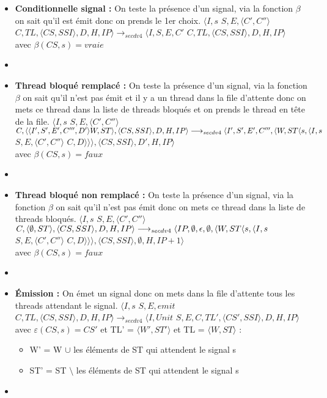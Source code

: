 \documentclass[10pt,a4paper]{article}
\begin{document}
\begin{enumerate}
\begin{itemize}
					\item[] \textbf{Conditionnelle signal :} On teste la présence d'un signal, via la fonction $\beta$ on sait qu'il est émit donc on prends le 1er choix.
					\smallbreak
					$\langle I,s$ $S,E,\langle C',C''\rangle$ $C,TL,\langle CS,SSI\rangle,D,H,IP\rangle 
					\longrightarrow_{secdv4} \langle I,S,E,C'$ $C,TL,\langle CS,SSI\rangle,D,H,IP\rangle$ \\
					avec $\beta(CS,s) = vraie$
					\item[]
					
					
					\item[] \textbf{ Thread bloqué remplacé :} On teste la présence d'un signal, via la fonction $\beta$ on sait qu'il n'est pas émit et il y a un thread dans la file d'attente
					donc on mets ce thread dans la liste de threads bloqués et on prends le thread en tête de la file.
					\smallbreak
					$\langle I,s$ $S,E,\langle C',C''\rangle$ $C,\langle\langle I',S',E',C''',D'\rangle W,ST\rangle,\langle CS,SSI\rangle,D,H,IP\rangle 
					\\\longrightarrow_{secdv4} \langle I',S',E',C''',\langle W,ST\langle s,\langle I,s$ $S,E,\langle C',C''\rangle$ $C,D\rangle\rangle\rangle,\langle CS,SSI\rangle,D',H,IP\rangle$ \\
					avec $\beta(CS,s) = faux$
					\item[]	
					
					\item[] \textbf{Thread bloqué non remplacé :} On teste la présence d'un signal, via la fonction $\beta$ on sait qu'il n'est pas émit donc on mets ce thread dans la liste de threads bloqués.
					\smallbreak 
					$\langle I,s$ $S,E,\langle C',C''\rangle$ $C,\langle \emptyset,ST\rangle,\langle CS,SSI\rangle,D,H,IP\rangle 
					\\\longrightarrow_{secdv4} \langle IP,\emptyset,\epsilon,\emptyset,\langle W,ST\langle s,\langle I,s$ $S,E,\langle C',C''\rangle$ $C,D\rangle\rangle\rangle,\langle CS,SSI\rangle,\emptyset,H,IP+1\rangle$ \\
					avec $\beta(CS,s) = faux$
					\item[]	
					\newpage
					\item[] \textbf{Émission :} On émet un signal donc on mets dans la file d'attente tous les threads attendant le signal.
					\smallbreak
					$\langle I,s$ $S,E,emit$ $C,TL,\langle CS,SSI\rangle,D,H,IP\rangle 
					\longrightarrow_{secdv4} \langle I,Unit$ $S,E,C,TL',\langle CS',SSI\rangle,D,H,IP\rangle$\\
					avec $\varepsilon(CS,s) = CS'$ et TL' = $\langle W',ST'\rangle$ et TL = $\langle W,ST\rangle$ :
					\begin{itemize}
						\item[] W' = W $\cup$ les éléments de ST qui attendent le signal s 
						\item[] ST' = ST $\setminus$ les éléments de ST qui attendent le signal s 
					\end{itemize}
					\item[]
					

\end{itemize}
\end{enumerate}
\end{document}
